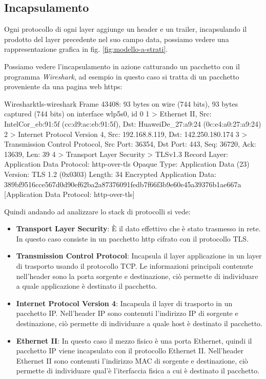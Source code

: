 \subsection{Incapsulamento \workinprogress}

Ogni protocollo di ogni layer aggiunge un header e un trailer, incapsulando il prodotto del layer precedente nel suo campo data, possiamo vedere una rappresentazione grafica in fig. \ref{fig:modello-a-strati}.


Possiamo vedere l'incapsulamento in azione catturando un pacchetto con il programma \textit{Wireshark}, ad esempio in questo caso si tratta di un pacchetto proveniente da una pagina web https:

\begin{bashcode}{Wireshark}{tls-wireshark}
Frame 43408: 93 bytes on wire (744 bits), 93 bytes captured (744 bits) on interface wlp5s0, id 0
1 > Ethernet II, Src: IntelCor_eb:91:5f (cc:d9:ac:eb:91:5f), Dst: HuaweiDe_27:a9:24 (0c:e4:a0:27:a9:24)
2 > Internet Protocol Version 4, Src: 192.168.8.119, Dst: 142.250.180.174
3 > Transmission Control Protocol, Src Port: 36354, Dst Port: 443, Seq: 36720, Ack: 13639, Len: 39
4 > Transport Layer Security
> TLSv1.3 Record Layer: Application Data Protocol: http-over-tls
Opaque Type: Application Data (23)
Version: TLS 1.2 (0x0303)
Length: 34
Encrypted Application Data: 389bf9516cce567d0d90ef62ba2a87376091fedb7f66f3b9e60e45a39376b1ae667a
    [Application Data Protocol: http-over-tls]
\end{bashcode}

\todo[da perfezionare]

Quindi andando ad analizzare lo stack di protocolli si vede:

\begin{itemize}
    \item \textbf{Transport Layer Security}\cite{RFC_8446}: È il dato effettivo che è stato trasmesso in rete. In questo caso consiste in un pacchetto http cifrato con il protocollo TLS.

    \item \textbf{Transmission Control Protocol}\cite{RFC_0793}: Incapsula il layer applicazione in un layer di trasporto usando il protocollo TCP. Le informazioni principali contenute nell'header sono la porta sorgente e destinazione, ciò permette di individuare a quale applicazione è destinato il pacchetto.
    
    \item \textbf{Internet Protocol Version 4}\cite{RFC_0791}: Incapsula il layer di trasporto in un pacchetto IP. Nell'header IP sono contenuti l'indirizzo IP di sorgente e destinazione, ciò permette di individuare a quale host è destinato il pacchetto.
    
    \item \textbf{Ethernet II}\cite{ethernet-ii}: In questo caso il mezzo fisico è una porta Ethernet, quindi il pacchetto IP viene incapsulato con il protocollo Ethernet II. Nell'header Ethernet II sono contenuti l'indirizzo MAC di sorgente e destinazione, ciò permette di individuare qual'è l'iterfaccia fisica a cui è destinato il pacchetto.
\end{itemize}

